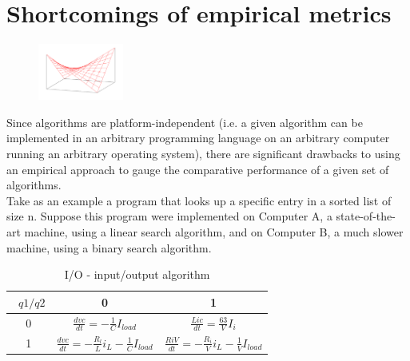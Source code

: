 \documentclass[openany,a4paper,12pt]{book}
\begin{document}
\section{Shortcomings of empirical metrics}

\begin{figure}
    \centering
    \includegraphics[width=0.25\textwidth]{picture7.png}
    \label{rys3}
\end{figure}Since algorithms are platform-independent (i.e. a given algorithm can be implemented in an arbitrary programming language on an arbitrary computer running an arbitrary operating system), there are significant drawbacks to using an empirical approach to gauge the comparative performance of a given set of algorithms.
\newline\\
Take as an example a program that looks up a specific entry in a sorted list of size n. Suppose this program were implemented on Computer A, a state-of-the-art machine, using a linear search algorithm, and on Computer B, a much slower machine, using a binary search algorithm.

\begin{table}[H]
\caption{I/O - input/output algorithm} 
\begin{center} 
\begin{tabular}{|c|c|c|}
\hline \ $q1/q2$ & 0 & 1 \\ \hline
0 & $\frac{d{v} c}{d t} = -\frac{1}{C}I_{load}$ & $\frac{L{i} c}{d t} = \frac{63}{V}I_{i}$  \\
1 & $\frac{d{v} c}{d t} = -\frac{R_{l}}{L} i_{L}- \frac{1}{C}I_{load}$ & $\frac{R{i} V}{d t} = -\frac{R_{i}}{V} i_{L}- \frac{1}{V}I_{load}$ \\ \hline
\end{tabular}
\end{center}
\end{table}
\end{document}
